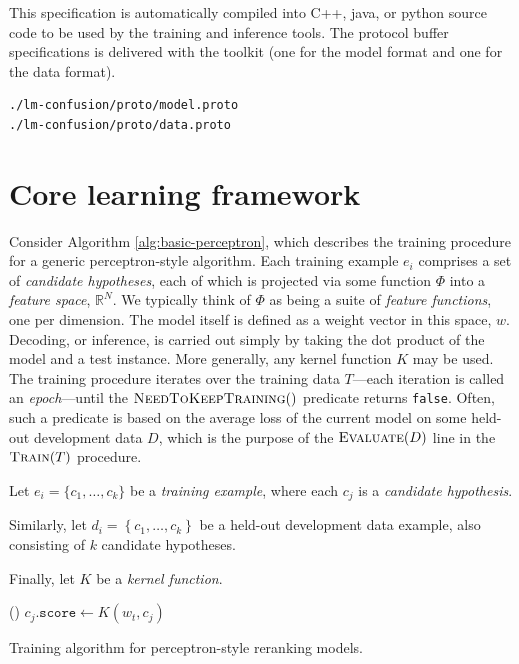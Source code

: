 \documentclass[a4paper]{article}
\begin{document}
This specification is automatically compiled into C++, java, or python source code to be
used by the training and inference tools.  The protocol buffer specifications is
delivered with the toolkit (one for the model format and one for the data
format).
\begin{verbatim}
./lm-confusion/proto/model.proto
./lm-confusion/proto/data.proto
\end{verbatim}


\section{Core learning framework}

Consider Algorithm \ref{alg:basic-perceptron}, which describes the
training procedure for a generic perceptron-style algorithm. Each
training example $e_{i}$ comprises a set of \emph{candidate hypotheses},
each of which is projected via some function $\Phi$ into a \emph{feature
space}, $\mathbb{R}^{N}$. We typically think of $\Phi$ as being
a suite of \emph{feature functions}, one per dimension.\emph{ }The\emph{
}model itself is defined as a weight vector in this space, $w$. Decoding,
or inference, is carried out simply by taking the dot product of the
model and a test instance. More generally, any kernel function $K$
may be used. The training procedure iterates over the training data
$T$---each iteration is called an \emph{epoch}---until the $\Call{NeedToKeepTraining}{}()$
predicate returns \texttt{false}. Often, such a predicate is based
on the average loss of the current model on some held-out development
data $D$, which is the purpose of the $\Call{Evaluate}{D}$ line
in the $\Call{Train}{T}$ procedure.

\begin{algorithm}
Let $e_{i}=\{c_{1},\ldots,c_{k}\}$ be a \emph{training example},
where each $c_{j}$ is a \emph{candidate hypothesis}.

Similarly, let $d_{i}=\left\{ c_{1},\ldots,c_{k}\right\} $ be a held-out
development data example, also consisting of $k$ candidate hypotheses.

Finally, let $K$ be a \emph{kernel function}.

\renewcommand\algorithmicforall{\textbf{foreach}}
\begin{algorithmic}
    \State {}
    \State {}
  \EndWhile
\EndProcedure
\State
{}
    \State {}
      \State {}()
    \EndIf
  \EndFor
\EndProcedure
\State
{}
    \State $c_j.\texttt{score} \leftarrow K(w_t, c_j)$
  \EndFor
\EndProcedure
\end{algorithmic}

\caption{\label{alg:basic-perceptron}Training algorithm for perceptron-style
reranking models.}
\end{algorithm}
\end{document}
